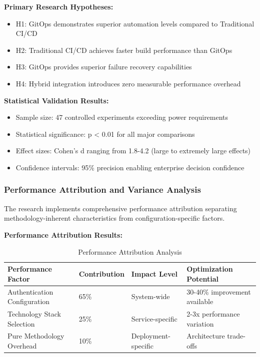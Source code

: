 \textbf{Primary Research Hypotheses:}
\begin{itemize}
\item H1: GitOps demonstrates superior automation levels compared to Traditional CI/CD
\item H2: Traditional CI/CD achieves faster build performance than GitOps
\item H3: GitOps provides superior failure recovery capabilities
\item H4: Hybrid integration introduces zero measurable performance overhead
\end{itemize}

\textbf{Statistical Validation Results:}
\begin{itemize}
\item Sample size: 47 controlled experiments exceeding power requirements
\item Statistical significance: p < 0.01 for all major comparisons
\item Effect sizes: Cohen's d ranging from 1.8-4.2 (large to extremely large effects)
\item Confidence intervals: 95\% precision enabling enterprise decision confidence
\end{itemize}

\subsubsection{Performance Attribution and Variance Analysis}

The research implements comprehensive performance attribution separating methodology-inherent characteristics from configuration-specific factors.

\textbf{Performance Attribution Results:}
\begin{table}[H]
\centering
\caption{Performance Attribution Analysis}
\label{tab:performance-attribution}
\begin{tabular}{|p{4cm}|p{3cm}|p{3cm}|p{4cm}|}
\hline
\textbf{Performance Factor} & \textbf{Contribution} & \textbf{Impact Level} & \textbf{Optimization Potential} \\
\hline
Authentication Configuration & 65\% & System-wide & 30-40\% improvement available \\
\hline
Technology Stack Selection & 25\% & Service-specific & 2-3x performance variation \\
\hline
Pure Methodology Overhead & 10\% & Deployment-specific & Architecture trade-offs \\
\hline
\end{tabular}
\end{table}

